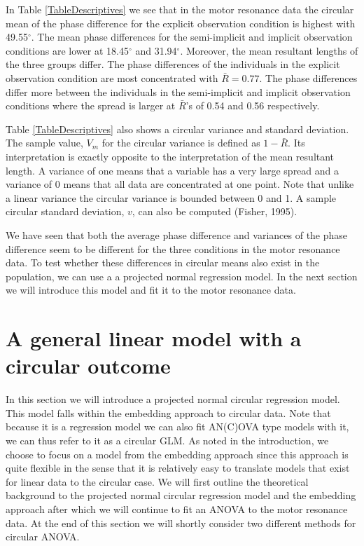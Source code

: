 \documentclass[11pt,]{article}
\begin{document}
In Table \ref{TableDescriptives} we see that in the motor resonance data
the circular mean of the phase difference for the explicit observation
condition is highest with 49.55\(^{\circ}\). The mean phase differences
for the semi-implicit and implicit observation conditions are lower at
18.45\(^{\circ}\) and 31.94\(^{\circ}\). Moreover, the mean resultant
lengths of the three groups differ. The phase differences of the
individuals in the explicit observation condition are most concentrated
with \(\bar{R} = 0.77\). The phase differences differ more between the
individuals in the semi-implicit and implicit observation conditions
where the spread is larger at \(\bar{R}\)'s of 0.54 and 0.56
respectively.

Table \ref{TableDescriptives} also shows a circular variance and
standard deviation. The sample value, \(V_m\) for the circular variance
is defined as \(1-\bar{R}\). Its interpretation is exactly opposite to
the interpretation of the mean resultant length. A variance of one means
that a variable has a very large spread and a variance of 0 means that
all data are concentrated at one point. Note that unlike a linear
variance the circular variance is bounded between 0 and 1. A sample
circular standard deviation, \(v\), can also be computed (Fisher, 1995).

We have seen that both the average phase difference and variances of the
phase difference seem to be different for the three conditions in the
motor resonance data. To test whether these differences in circular
means also exist in the population, we can use a a projected normal
regression model. In the next section we will introduce this model and
fit it to the motor resonance data.

\section{A general linear model with a circular outcome}\label{RegModel}

In this section we will introduce a projected normal circular regression
model. This model falls within the embedding approach to circular data.
Note that because it is a regression model we can also fit AN(C)OVA type
models with it, we can thus refer to it as a circular GLM. As noted in
the introduction, we choose to focus on a model from the embedding
approach since this approach is quite flexible in the sense that it is
relatively easy to translate models that exist for linear data to the
circular case. We will first outline the theoretical background to the
projected normal circular regression model and the embedding approach
after which we will continue to fit an ANOVA to the motor resonance
data. At the end of this section we will shortly consider two different
methods for circular ANOVA.
\end{document}
